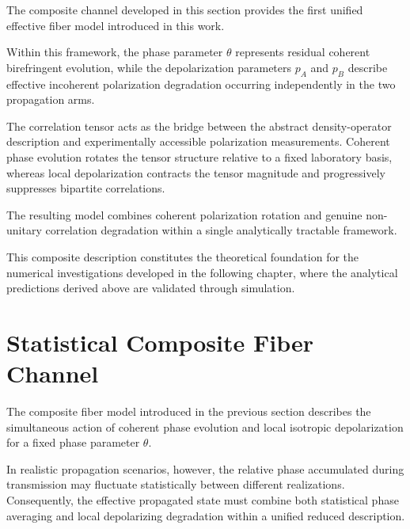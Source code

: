 The composite channel developed in this section provides the first unified effective fiber model introduced in this work.

\medskip

Within this framework, the phase parameter \( \theta \) represents residual coherent birefringent evolution, while the depolarization parameters \( p_A \) and \( p_B \) describe effective incoherent polarization degradation occurring independently in the two propagation arms.

\medskip

The correlation tensor acts as the bridge between the abstract density-operator description and experimentally accessible polarization measurements. Coherent phase evolution rotates the tensor structure relative to a fixed laboratory basis, whereas local depolarization contracts the tensor magnitude and progressively suppresses bipartite correlations.

\medskip

The resulting model combines coherent polarization rotation and genuine non-unitary correlation degradation within a single analytically tractable framework.

\medskip

This composite description constitutes the theoretical foundation for the numerical investigations developed in the following chapter, where the analytical predictions derived above are validated through simulation.


\section{Statistical Composite Fiber Channel}
\label{sec:statistical_composite_fiber_channel}

The composite fiber model introduced in the previous section describes the simultaneous action of coherent phase evolution and local isotropic depolarization for a fixed phase parameter \( \theta \).

\medskip

In realistic propagation scenarios, however, the relative phase accumulated during transmission may fluctuate statistically between different realizations. Consequently, the effective propagated state must combine both statistical phase averaging and local depolarizing degradation within a unified reduced description.

